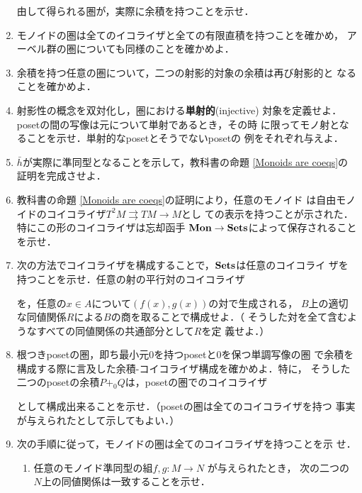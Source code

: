 \begin{enumerate}
       由して得られる圏が，実際に余積を持つことを示せ．
 \item モノイドの圏は全てのイコライザと全ての有限直積を持つことを確かめ，
       アーベル群の圏についても同様のことを確かめよ．
 \item 余積を持つ任意の圏について，二つの射影的対象の余積は再び射影的と
       なることを確かめよ．
 \item 射影性の概念を双対化し，圏における{\bfseries 単射的}(injective)
       対象を定義せよ．posetの間の写像は元について単射であるとき，その時
       に限ってモノ射となることを示せ．単射的なposetとそうでないposetの
       例をそれぞれ与えよ．
 \item $\bar h$が実際に準同型となることを示して，教科書の命題
       \ref{Monoids are coeqs}の証明を完成させよ．
 \item 教科書の命題 \ref{Monoids are coeqs}の証明により，任意のモノイド
       は自由モノイドのコイコライザ$T^2M \rightrightarrows TM \to M$とし
       ての表示を持つことが示された．特にこの形のコイコライザは忘却函手
       $\mathbf{Mon}\to\mathbf{Sets}$によって保存されることを示せ．
 \item 次の方法でコイコライザを構成することで，$\mathbf{Sets}$は任意のコイコライ
       ザを持つことを示せ．任意の射の平行対のコイコライザ
       \begin{center}
       \end{center}
       を，任意の$x \in A$について$(f(x), g(x))$の対で生成される，
       $B$上の適切な同値関係$R$による$B$の商を取ることで構成せよ．（
       そうした対を全て含むようなすべての同値関係の共通部分として$R$を定
       義せよ．）
 \item 根つきposetの圏，即ち最小元$0$を持つposetと$0$を保つ単調写像の圏
       で余積を構成する際に言及した余積-コイコライザ構成を確かめよ．特に，
       そうした二つのposetの余積$P +_0 Q$は，posetの圏でのコイコライザ
       \begin{center}
       \end{center}
       として構成出来ることを示せ．（posetの圏は全てのコイコライザを持つ
       事実が与えられたとして示してもよい．）
 \item 次の手順に従って，モノイドの圏は全てのコイコライザを持つことを示
       せ．
       \begin{enumerate}
	\renewcommand{\labelenumii}{\arabic{enumii}. }
	\item 任意のモノイド準同型の組$f, g: M \to N$ が与えられたとき，
	      次の二つの$N$上の同値関係は一致することを示せ．
	      

\end{enumerate}
\end{enumerate}
